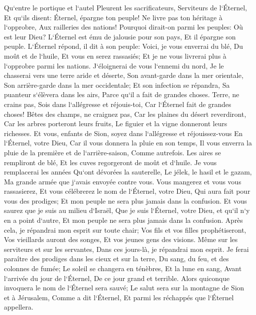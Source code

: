 \verse Qu`entre le portique et l`autel Pleurent les sacrificateurs, Serviteurs de l`Éternel, Et qu`ils disent: Éternel, épargne ton peuple! Ne livre pas ton héritage à l`opprobre, Aux railleries des nations! Pourquoi dirait-on parmi les peuples: Où est leur Dieu? 
\verse L`Éternel est ému de jalousie pour son pays, Et il épargne son peuple. 
\verse L`Éternel répond, il dit à son peuple: Voici, je vous enverrai du blé, Du moût et de l`huile, Et vous en serez rassasiés; Et je ne vous livrerai plus à l`opprobre parmi les nations. 
\verse J`éloignerai de vous l`ennemi du nord, Je le chasserai vers une terre aride et déserte, Son avant-garde dans la mer orientale, Son arrière-garde dans la mer occidentale; Et son infection se répandra, Sa puanteur s`élèvera dans les airs, Parce qu`il a fait de grandes choses. 
\verse Terre, ne crains pas, Sois dans l`allégresse et réjouis-toi, Car l`Éternel fait de grandes choses! 
\verse Bêtes des champs, ne craignez pas, Car les plaines du désert reverdiront, Car les arbres porteront leurs fruits, Le figuier et la vigne donneront leurs richesses. 
\verse Et vous, enfants de Sion, soyez dans l`allégresse et réjouissez-vous En l`Éternel, votre Dieu, Car il vous donnera la pluie en son temps, Il vous enverra la pluie de la première et de l`arrière-saison, Comme autrefois. 
\verse Les aires se rempliront de blé, Et les cuves regorgeront de moût et d`huile. 
\verse Je vous remplacerai les années Qu`ont dévorées la sauterelle, Le jélek, le hasil et le gazam, Ma grande armée que j`avais envoyée contre vous. 
\verse Vous mangerez et vous vous rassasierez, Et vous célébrerez le nom de l`Éternel, votre Dieu, Qui aura fait pour vous des prodiges; Et mon peuple ne sera plus jamais dans la confusion. 
\verse Et vous saurez que je suis au milieu d`Israël, Que je suis l`Éternel, votre Dieu, et qu`il n`y en a point d`autre, Et mon peuple ne sera plus jamais dans la confusion. 
\verse Après cela, je répandrai mon esprit sur toute chair; Vos fils et vos filles prophétiseront, Vos vieillards auront des songes, Et vos jeunes gens des visions. 
\verse Même sur les serviteurs et sur les servantes, Dans ces jours-là, je répandrai mon esprit. 
\verse Je ferai paraître des prodiges dans les cieux et sur la terre, Du sang, du feu, et des colonnes de fumée; 
\verse Le soleil se changera en ténèbres, Et la lune en sang, Avant l`arrivée du jour de l`Éternel, De ce jour grand et terrible. 
\verse Alors quiconque invoquera le nom de l`Éternel sera sauvé; Le salut sera sur la montagne de Sion et à Jérusalem, Comme a dit l`Éternel, Et parmi les réchappés que l`Éternel appellera. 

